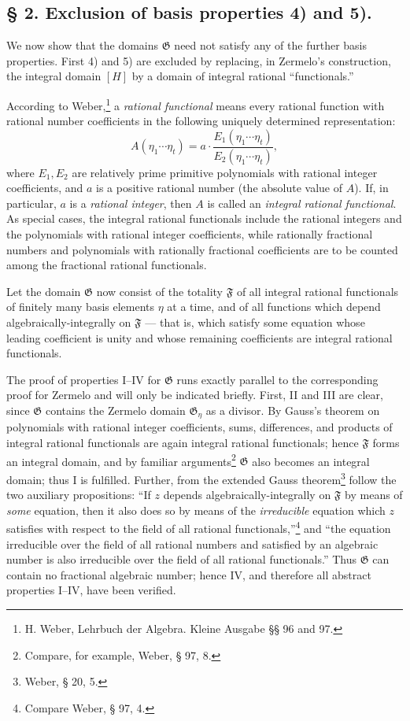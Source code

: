 \documentclass[11pt]{article}
\begin{document}
\subsection*{§ 2. Exclusion of basis properties 4) and 5).}

We now show that the domains $\mathfrak G$ need not satisfy any of the further
basis properties. First 4) and 5) are excluded by replacing, in Zermelo's
construction, the integral domain $[H]$ by a domain of integral rational
``functionals.''

According to Weber,\footnote{H. Weber, Lehrbuch der Algebra. Kleine Ausgabe
§§ 96 and 97.} a \emph{rational functional} means every rational function with
rational number coefficients in the following uniquely determined representation:
\[
 A(\eta_1\cdots \eta_t)
   = a\cdot\frac{E_1(\eta_1\cdots \eta_t)}{E_2(\eta_1\cdots \eta_t)},
\]
where $E_1,E_2$ are relatively prime primitive polynomials with rational integer
coefficients, and $a$ is a positive rational number (the absolute value of $A$).
If, in particular, $a$ is a \emph{rational integer}, then $A$ is called an
\emph{integral rational functional}. As special cases, the integral rational
functionals include the rational integers and the polynomials with rational
integer coefficients, while rationally fractional numbers and polynomials with
rationally fractional coefficients are to be counted among the fractional rational
functionals.

Let the domain $\mathfrak G$ now consist of the totality $\mathfrak F$ of all
integral rational functionals of finitely many basis elements $\eta$ at a time,
and of all functions which depend algebraically-integrally on $\mathfrak F$ ---
that is, which satisfy some equation whose leading coefficient is unity and whose
remaining coefficients are integral rational functionals.

The proof of properties I--IV for $\mathfrak G$ runs exactly parallel to the
corresponding proof for Zermelo and will only be indicated briefly. First, II and
III are clear, since $\mathfrak G$ contains the Zermelo domain
$\mathfrak G_\eta$ as a divisor. By Gauss's theorem on polynomials with rational
integer coefficients, sums, differences, and products of integral rational
functionals are again integral rational functionals; hence $\mathfrak F$ forms an
integral domain, and by familiar arguments\footnote{Compare, for example, Weber,
§ 97, 8.} $\mathfrak G$ also becomes an integral domain; thus I is fulfilled.
Further, from the extended Gauss theorem\footnote{Weber, § 20, 5.} follow the two
auxiliary propositions: ``If $z$ depends algebraically-integrally on
$\mathfrak F$ by means of \emph{some} equation, then it also does so by means of
the \emph{irreducible} equation which $z$ satisfies with respect to the field of
all rational functionals,''\footnote{Compare Weber, § 97, 4.} and ``the equation
irreducible over the field of all rational numbers and satisfied by an algebraic
number is also irreducible over the field of all rational functionals.'' Thus
$\mathfrak G$ can contain no fractional algebraic number; hence IV, and therefore
all abstract properties I--IV, have been verified.
\end{document}
